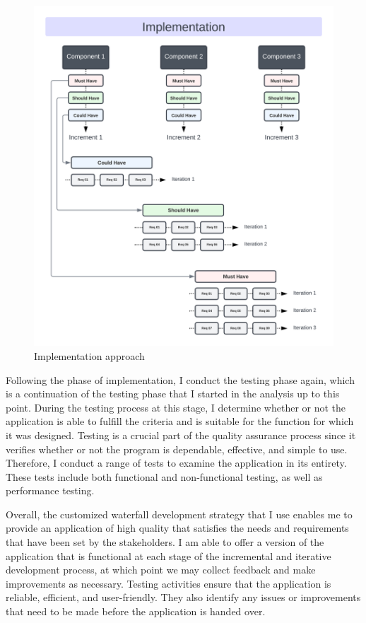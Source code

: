 \begin{justify}
\begin{figure}[H]
    \centerline{\includegraphics[width=150mm,scale=1]{figures/methodology/ImplementationsApproach.png}}
    \caption{Implementation approach}
    \label{ImplementationsApproach}
\end{figure}

\noindent
Following the phase of implementation, I conduct the testing phase again, which is a continuation of the testing phase that I started in the analysis up to this point. During the testing process at this stage, I determine whether or not the application is able to fulfill the criteria and is suitable for the function for which it was designed. Testing is a crucial part of the quality assurance process since it verifies whether or not the program is dependable, effective, and simple to use. Therefore, I conduct a range of tests to examine the application in its entirety. These tests include both functional and non-functional testing, as well as performance testing.

\vspace{0.25cm}
\newendline Overall, the customized waterfall development strategy that I use enables me to provide an application of high quality that satisfies the needs and requirements that have been set by the stakeholders. I am able to offer a version of the application that is functional at each stage of the incremental and iterative development process, at which point we may collect feedback and make improvements as necessary. Testing activities ensure that the application is reliable, efficient, and user-friendly. They also identify any issues or improvements that need to be made before the application is handed over.\\

\end{justify}

